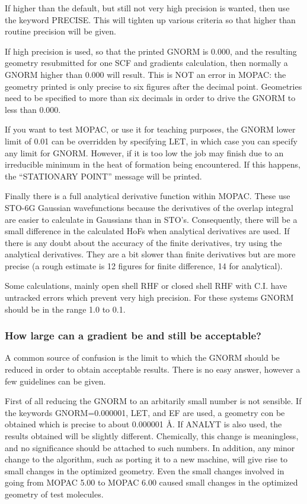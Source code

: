 \documentclass[11pt]{book}
\newcommand{\mi}[1]{#1\index{#1}}
\begin{document}
        If higher than the default, but still not very  high  precision  is
   wanted,  then  use  the  keyword  PRECISE.  This will tighten up various
   criteria so that higher than routine precision will be given.

        If high precision is used, so that the printed GNORM is 0.000,  and
   the   resulting   geometry   resubmitted   for  one  SCF  and  gradients
   calculation, then normally a GNORM higher than 0.000 will result.   This
   is  NOT  an error in MOPAC:  the geometry printed is only precise to six
   figures after the decimal point.  Geometries need  to  be  specified  to
   more than six decimals in order to drive the GNORM to less than 0.000.

        If you want to test MOPAC, or use it  for  teaching  purposes,  the
   GNORM  lower limit of 0.01 can be overridden by specifying LET, in which
   case you can specify any limit for GNORM.  However, if it is too low the
   job  may  finish  due to an irreducible minimum in the heat of formation
   being encountered.  If this happens, the ``STATIONARY POINT'' message will
   be printed.

        Finally there is  a  full  analytical  derivative  function  within
   MOPAC.   These use STO-6G Gaussian wavefunctions because the derivatives
   of the overlap integral are easier to calculate  in  Gaussians  than  in
   STO's.  Consequently, there will be a small difference in the calculated
   HoFs when \mi{analytical derivatives} are used.  If  there  is  any  doubt
   about  the  accuracy of the finite derivatives, try using the analytical
   derivatives.  They are a bit slower than finite derivatives but are more
   precise  (a  rough  estimate is 12 figures for finite difference, 14 for
   analytical).

        Some calculations, mainly open shell RHF or closed shell  RHF  with
   C.I. have untracked errors which prevent very high precision.  For these
   systems GNORM should be in the range 1.0 to 0.1.

\subsubsection{How large can a gradient be and still be acceptable?}
        A common source of confusion is the limit to which the GNORM should
   be  reduced  in  order  to  obtain acceptable results.  There is no easy
   answer, however a few guidelines can be given.
 
      First of all reducing the GNORM to an arbitarily  small  number  is
 not  sensible.   If the keywords GNORM=0.000001, LET, and EF are used, a
 geometry con be obtained which is precise to about  0.000001 \AA.
 If ANALYT is also used, the results obtained will be slightly different.
 Chemically, this change is meaningless, and no  significance  should  be
 attached  to  such  numbers.   In  addition,  any  minor  change  to the
 algorithm, such as porting it to a new machine, will give rise to  small
 changes  in  the optimized geometry.  Even the small changes involved in
 going from MOPAC  5.00  to  MOPAC  6.00  caused  small  changes  in  the
 optimized geometry of test molecules.
\end{document}

